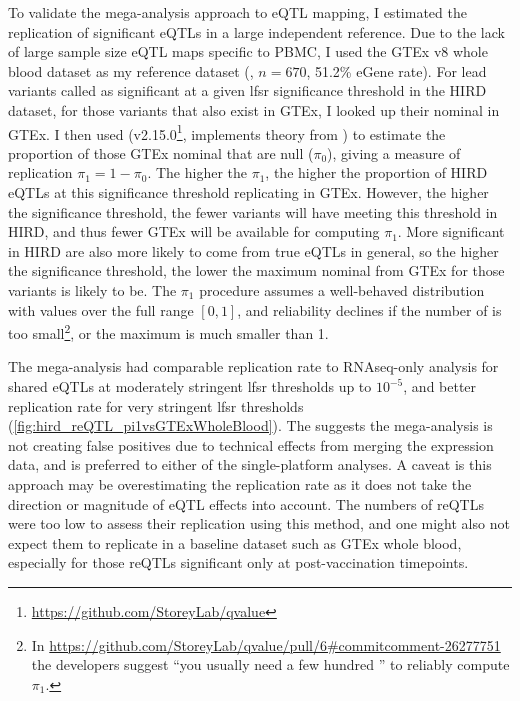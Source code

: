 To validate the mega-analysis approach to \gls{eQTL} mapping, I estimated the replication of significant \glspl{eQTL} in a large independent reference.
Due to the lack of large sample size \gls{eQTL} maps specific to \gls{PBMC}, I used the GTEx v8 whole blood dataset as my reference dataset (\autocite{thegtexconsortium2020GTExConsortiumAtlas}, $n=670$, 51.2\% eGene rate).
For lead variants called as significant at a given \gls{lfsr} significance threshold in the \gls{HIRD} dataset, for those variants that also exist in GTEx, I looked up their nominal \pvalues{} in GTEx.
I then used  (v2.15.0\footnote{\url{https://github.com/StoreyLab/qvalue}}, implements theory from \textcite{storey2003StatisticalSignificanceGenomewide}) to estimate the proportion of those GTEx nominal \pvalues{} that are null ($\pi_0$), giving a measure of replication $\pi_1 = 1 - \pi_0$.
The higher the $\pi_1$, the higher the proportion of \gls{HIRD} \glspl{eQTL} at this significance threshold replicating in GTEx.
However, the higher the significance threshold, the fewer variants will have \pvalues{} meeting this threshold in \gls{HIRD}, and thus fewer GTEx \pvalues{} will be available for computing $\pi_1$.
More significant \pvalues{} in \gls{HIRD} are also more likely to come from true \glspl{eQTL} in general, so the higher the significance threshold, the lower the maximum nominal \pvalue{} from GTEx for those variants is likely to be.
The $\pi_1$ procedure assumes a well-behaved \pvalue{} distribution with values over the full range $\left[0, 1\right]$, 
and reliability declines if the number of \pvalues{} is too small\footnote{In \url{https://github.com/StoreyLab/qvalue/pull/6\#commitcomment-26277751} the developers suggest \enquote{you usually need a few hundred \pvalues{}} to reliably compute $\pi_1$.}, or the maximum \pvalue{} is much smaller than 1.

The mega-analysis had comparable replication rate to \gls{RNAseq}-only analysis for shared \glspl{eQTL} at moderately stringent \gls{lfsr} thresholds up to $10^{-5}$, and better replication rate for very stringent \gls{lfsr} thresholds (\cref{fig:hird_reQTL_pi1vsGTExWholeBlood}).
The suggests the mega-analysis is not creating false positives due to technical effects from merging the expression data, and is preferred to either of the single-platform analyses. 
A caveat is this approach may be overestimating the replication rate as it does not take the direction or magnitude of \gls{eQTL} effects into account.
The numbers of \glspl{reQTL} were too low to assess their replication using this method, and one might also not expect them to replicate in a baseline dataset such as GTEx whole blood, especially for those \glspl{reQTL} significant only at post-vaccination timepoints.

